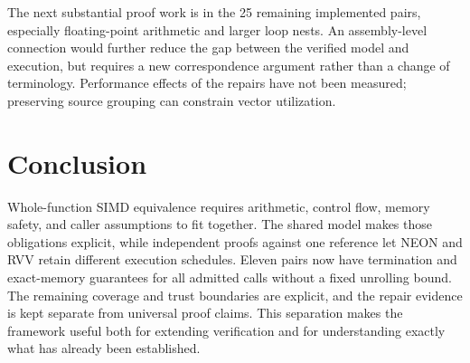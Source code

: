 \documentclass[11pt]{article}
\begin{document}
The next substantial proof work is in the 25 remaining implemented pairs, especially floating-point arithmetic and larger loop nests. An assembly-level connection would further reduce the gap between the verified model and execution, but requires a new correspondence argument rather than a change of terminology. Performance effects of the repairs have not been measured; preserving source grouping can constrain vector utilization.

\section{Conclusion}
Whole-function SIMD equivalence requires arithmetic, control flow, memory safety, and caller assumptions to fit together. The shared model makes those obligations explicit, while independent proofs against one reference let NEON and RVV retain different execution schedules. Eleven pairs now have termination and exact-memory guarantees for all admitted calls without a fixed unrolling bound. The remaining coverage and trust boundaries are explicit, and the repair evidence is kept separate from universal proof claims. This separation makes the framework useful both for extending verification and for understanding exactly what has already been established.

\label{body-end}
\clearpage
\end{document}
